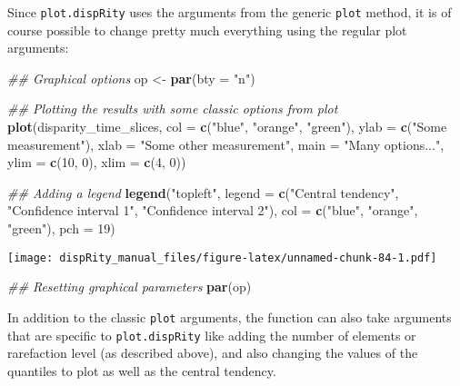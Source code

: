 \documentclass[
]{book}
\newenvironment{Shaded}{\begin{snugshade}}{\end{snugshade}}
\newcommand{\CommentTok}[1]{\textcolor[rgb]{0.56,0.35,0.01}{\textit{#1}}}
\newcommand{\DataTypeTok}[1]{\textcolor[rgb]{0.13,0.29,0.53}{#1}}
\newcommand{\DecValTok}[1]{\textcolor[rgb]{0.00,0.00,0.81}{#1}}
\newcommand{\KeywordTok}[1]{\textcolor[rgb]{0.13,0.29,0.53}{\textbf{#1}}}
\newcommand{\NormalTok}[1]{#1}
\newcommand{\StringTok}[1]{\textcolor[rgb]{0.31,0.60,0.02}{#1}}
\begin{document}
Since \texttt{plot.dispRity} uses the arguments from the generic \texttt{plot} method, it is of course possible to change pretty much everything using the regular plot arguments:

\begin{Shaded}
\begin{Highlighting}[]
\CommentTok{\#\# Graphical options}
\NormalTok{op \textless{}{-}}\StringTok{ }\KeywordTok{par}\NormalTok{(}\DataTypeTok{bty =} \StringTok{"n"}\NormalTok{)}

\CommentTok{\#\# Plotting the results with some classic options from plot}
\KeywordTok{plot}\NormalTok{(disparity\_time\_slices, }\DataTypeTok{col =} \KeywordTok{c}\NormalTok{(}\StringTok{"blue"}\NormalTok{, }\StringTok{"orange"}\NormalTok{, }\StringTok{"green"}\NormalTok{),}
    \DataTypeTok{ylab =} \KeywordTok{c}\NormalTok{(}\StringTok{"Some measurement"}\NormalTok{), }\DataTypeTok{xlab =} \StringTok{"Some other measurement"}\NormalTok{,}
    \DataTypeTok{main =} \StringTok{"Many options..."}\NormalTok{, }\DataTypeTok{ylim =} \KeywordTok{c}\NormalTok{(}\DecValTok{10}\NormalTok{, }\DecValTok{0}\NormalTok{), }\DataTypeTok{xlim =} \KeywordTok{c}\NormalTok{(}\DecValTok{4}\NormalTok{, }\DecValTok{0}\NormalTok{))}

\CommentTok{\#\# Adding a legend}
\KeywordTok{legend}\NormalTok{(}\StringTok{"topleft"}\NormalTok{, }\DataTypeTok{legend =} \KeywordTok{c}\NormalTok{(}\StringTok{"Central tendency"}\NormalTok{,}
                             \StringTok{"Confidence interval 1"}\NormalTok{,}
                             \StringTok{"Confidence interval 2"}\NormalTok{),}
      \DataTypeTok{col =} \KeywordTok{c}\NormalTok{(}\StringTok{"blue"}\NormalTok{, }\StringTok{"orange"}\NormalTok{, }\StringTok{"green"}\NormalTok{), }\DataTypeTok{pch =} \DecValTok{19}\NormalTok{)}
\end{Highlighting}
\end{Shaded}

\texttt{[image: dispRity\_manual\_files/figure-latex/unnamed-chunk-84-1.pdf]}

\begin{Shaded}
\begin{Highlighting}[]
\CommentTok{\#\# Resetting graphical parameters}
\KeywordTok{par}\NormalTok{(op)}
\end{Highlighting}
\end{Shaded}

In addition to the classic \texttt{plot} arguments, the function can also take arguments that are specific to \texttt{plot.dispRity} like adding the number of elements or rarefaction level (as described above), and also changing the values of the quantiles to plot as well as the central tendency.
\end{document}
